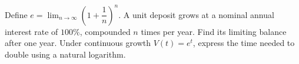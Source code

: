 Define $e=\lim_{n\to\infty}(1+\dfrac{1}{n})^n$. A unit deposit grows at a nominal annual interest rate of $100\%$, compounded $n$ times per year. Find its limiting balance after one year. Under continuous growth $V(t)=e^t$, express the time needed to double using a natural logarithm.
